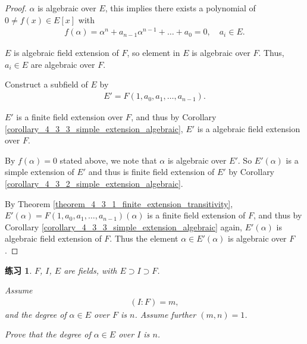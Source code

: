 \documentclass[utf8]{ctexbook}
\newtheorem{exercise}{练习}[section]
\begin{document}
\begin{proof}
$\alpha$ is algebraic over $E$, this implies there exists a polynomial of $0 \neq f(x) \in E[x]$ with
\begin{align*}
f(\alpha) = \alpha^n + a_{n-1} \alpha^{n-1} + \ldots + a_0 = 0, \quad a_i \in E .
\end{align*}

$E$ is algebraic field extension of $F$, so element in $E$ is algebraic over $F$. Thus, $a_i \in E $ are algebraic over $F$.

Construct a subfield of $E$ by
\begin{align*}
E' = F(1, a_0, a_1,  \ldots, a_{n-1} ) .
\end{align*}

$E'$ is a finite field extension over $F$, and thus by Corollary \ref{corollary_4_3_3_simple_extension_algebraic}, $E'$ is a algebraic field extension over $F$.

By $f(\alpha)=0$ stated above, we note that $\alpha$ is algebraic over $E'$. So $E' (\alpha)$ is a simple extension of $E'$ and thus is finite field extension of $E'$ by Corollary \ref{corollary_4_3_2_simple_extension_algebraic}. 

By Theorem \ref{theorem_4_3_1_finite_extension_transitivity}, $E'(\alpha) = F(1, a_0, a_1,  \ldots, a_{n-1} ) (\alpha) $ is a finite field extension of $F$, and thus by Corollary \ref{corollary_4_3_3_simple_extension_algebraic} again, $E'(\alpha)$ is algebraic field extension of $F$. Thus the element $\alpha \in E' (\alpha)$ is algebraic over $F$.

\end{proof}


\begin{exercise}
$F$, $I$, $E$ are fields, with $E \supset I \supset F$.

Assume 
\begin{align*}
(I:F) = m ,
\end{align*}
and the degree of $\alpha \in E$ over $F$ is $n$. Assume further $(m,n) = 1$.

Prove that the degree of $\alpha \in E$ over $I$ is $n$.

\end{exercise}
\end{document}
